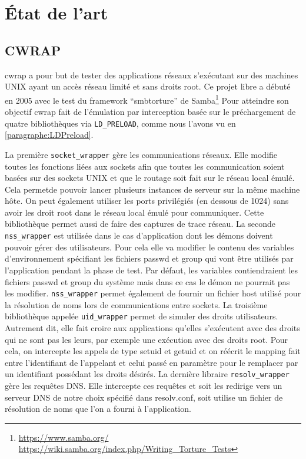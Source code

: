 \section{État de l'art}
\label{section:sota}
\subsection{CWRAP}

cwrap\citep{cwrap, cwrap_bis} a pour but de tester des applications réseaux s'exécutant sur des machines UNIX ayant un accès réseau limité et sans droits root. Ce projet libre a débuté en 2005 avec le test du framework ``smbtorture'' de Samba\footnote{\url{https://www.samba.org/} \\ \url{https://wiki.samba.org/index.php/Writing\_Torture\_Tests}} Pour atteindre son objectif cwrap fait de l'émulation par interception basée sur le préchargement de quatre bibliothèques via \texttt{LD\_PRELOAD}, comme nous l'avons vu en \ref{paragraphe:LDPreload}.

La première \texttt{socket\_wrapper} gère les communications réseaux. Elle modifie toutes les fonctions liées aux sockets afin que toutes les communication soient basées sur des sockets UNIX et que le routage soit fait sur le réseau local émulé. Cela permetde pouvoir lancer plusieurs instances de serveur sur la même machine hôte. On peut également utiliser les ports privilégiés (en dessous de 1024) sans avoir les droit root dans le réseau local émulé pour communiquer. Cette bibliothèque permet aussi de faire des captures de trace réseau. La seconde \texttt{nss\_wrapper} est utilisée dans le cas d'application dont les démons doivent pouvoir gérer des utilisateurs. Pour cela elle va modifier le contenu des variables d'environnement spécifiant les fichiers passwd et group qui vont être utilisés par l'application pendant la phase de test. Par défaut, les variables contiendraient les fichiers passwd et group du système mais dans ce cas le démon ne pourrait pas les modifier. \texttt{nss\_wrapper} permet également de fournir un fichier host utilisé pour la résolution de noms lors de communications entre sockets. La troisième bibliothèque appelée \texttt{uid\_wrapper} permet de simuler des droits utilisateurs. Autrement dit, elle fait croire aux applications qu'elles s'exécutent avec des droits qui ne sont pas les leurs, par exemple une exécution avec des droits root. Pour cela, on intercepte les appels de type setuid et getuid et on réécrit le mapping fait entre l'identifiant de l'appelant et celui passé en paramètre pour le remplacer par un identifiant possédant les droits désirés. La dernière libraire \texttt{resolv\_wrapper} gère les requêtes DNS. Elle intercepte ces requêtes et soit les redirige vers un serveur DNS de notre choix spécifié dans resolv.conf, soit utilise un fichier de résolution de noms que l'on a fourni à l'application.

